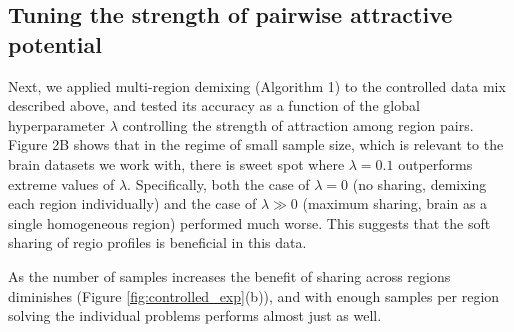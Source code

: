 \documentclass{article} %
\begin{document}
\subsection{Tuning the strength of pairwise attractive potential}
\vspace{-10pt}
Next, we applied multi-region demixing (Algorithm 1) to the controlled data mix described above, and tested its accuracy as a function of the global hyperparameter $\lambda$ controlling the strength of attraction among region pairs. Figure 2B shows that in the regime of small sample size, which is relevant to the brain datasets we work with, there is sweet spot where $\lambda=0.1$ outperforms extreme values of $\lambda$. Specifically, both the case of $\lambda=0$ (no sharing, demixing each region individually) and the case of $\lambda \gg0$ (maximum sharing, brain as a single homogeneous region) performed much worse. This suggests that the soft sharing of regio profiles is beneficial in this data.  

As the number of samples increases the benefit of sharing across regions diminishes (Figure \ref{fig:controlled_exp}(b)), and with enough samples per region solving the individual problems performs almost just as well. 
\end{document}
